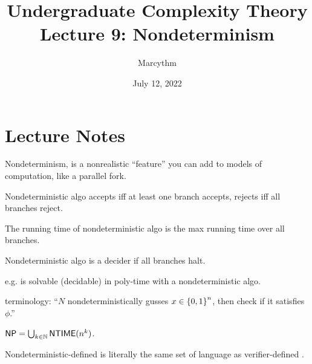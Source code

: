 \documentclass{article}
\title{Undergraduate Complexity Theory \\ Lecture 9: Nondeterminism}
\author{Marcythm}
\date{July 12, 2022}
\begin{document}
\maketitle{}

\section{Lecture Notes}

Nondeterminism, is a nonrealistic ``feature'' you can add to models of computation, like a parallel fork.

\begin{definition}
  Nondeterministic algo accepts iff at least one branch accepts, rejects iff all branches reject.
\end{definition}

\begin{definition}
  The running time of nondeterministic algo is the max running time over all branches.
\end{definition}

\begin{definition}
  Nondeterministic algo is a decider if all branches halt.
\end{definition}

e.g.  is solvable (decidable) in poly-time with a nondeterministic algo.

terminology: ``\(N\) nondeterministically gusses \(x \in \left\lbrace 0, 1 \right\rbrace^n\), then check if it satisfies \(\phi\).''


\begin{definition}
  \( \text{\sf NP} = \bigcup_{k \in \mathbb N} \text{\sf NTIME}(n^k) \).
\end{definition}

\begin{theorem}
  Nondeterministic-defined \NP is literally the same set of language as verifier-defined \NP.
\end{theorem}
\end{document}
